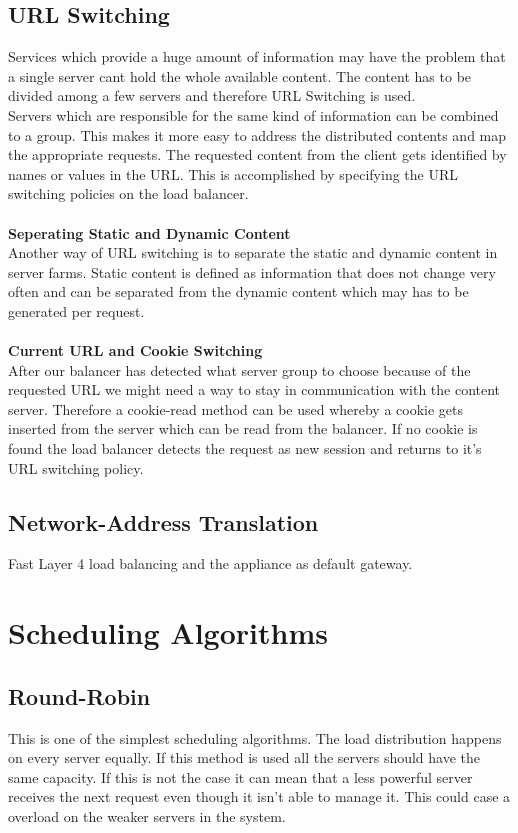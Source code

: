 \documentclass[12p]{article}
\begin{document}
	\subsection{URL Switching}
	Services which provide a huge amount of information may have the problem that a single server cant hold the whole available content. The content has to be divided among a few servers and therefore URL Switching is used.\\
	Servers which are responsible for the same kind of information can be combined to a group. This makes it more easy to address the distributed contents and map the appropriate requests.
	The requested content from the client gets identified by names or values in the URL. This is accomplished by specifying the URL switching policies on the load balancer.\\
	\\
	\textbf{Seperating Static and Dynamic Content}\\
	Another way of URL switching is to separate the static and dynamic content in server farms. Static content is defined as information that does not change very often and can be separated from the dynamic content which may has to be generated per request.\\
	\\
	\textbf{Current URL and Cookie Switching}\\
	After our balancer has detected what server group to choose because of the requested URL we might need a way to stay in communication with the content server. Therefore a cookie-read method can be used whereby a cookie gets inserted from the server which can be read from the balancer.
	If no cookie is found the load balancer detects the request as new session and returns to it's URL switching policy.
	
	\newpage
	\subsection{Network-Address Translation}
	Fast Layer 4 load balancing and the appliance as default gateway.
	
	\newpage
	\section{Scheduling Algorithms}
	\subsection{Round-Robin}
	This is one of the simplest scheduling algorithms. The load distribution happens on every server equally. If this method is used all the servers should have the same capacity. If this is not the case it can mean that a less powerful server receives the next request even though it isn't able to manage it. This could case a overload on the weaker servers in the system. 
	
\end{document}
